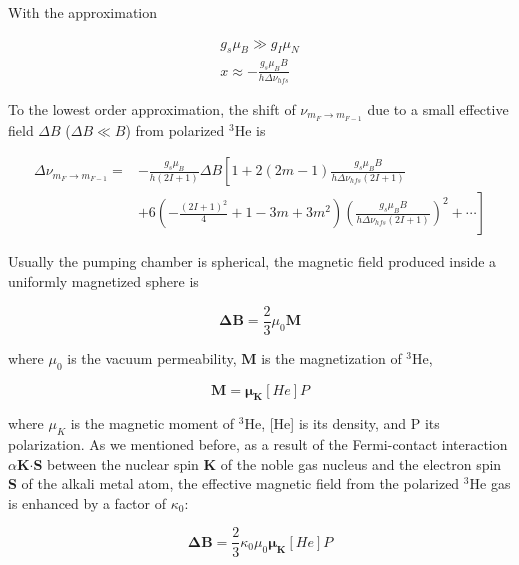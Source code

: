 With the approximation

\begin{subequations}
	\begin{gather}
	g_{s}\mu_{B} \gg g_{I}\mu_{N}\\
	x \approx -\frac{g_{s}\mu_{B}B}{h\Delta \nu_{hfs}}
	\end{gather}
\end{subequations}

To the lowest order approximation, the shift of $\nu_{m_{F}\rightarrow m_{F-1}}$ due to a small effective field $\Delta B$ ($\Delta B \ll B$) from polarized $^{3}$He is

\begin{equation}
\begin{split}
\Delta \nu_{m_{F}\rightarrow m_{F-1}} = &-\frac{g_{s}\mu_{B}}{h(2I+1)} \Delta B \left[1+ 2(2m-1)\frac{g_{s}\mu_{B}B}{h \Delta\nu_{hfs}(2I+1)}\right.\\ 
&\left.+6\left(-\frac{(2I+1)^{2}}{4}+1-3m+3m^{2}\right)\left(\frac{g_{s}\mu_{B}B}{h \Delta\nu_{hfs}(2I+1)}\right)^{2}+\cdots\right]
\end{split}
\end{equation}

Usually the pumping chamber is spherical, the magnetic field produced inside a uniformly magnetized sphere is

\begin{equation}
\boldsymbol{\Delta B}=\frac{2}{3}\mu_{0}\boldsymbol{M}
\end{equation}

where $\mu_{0}$ is the vacuum permeability, $\boldsymbol{M}$ is the magnetization of $^{3}$He, 

\begin{equation}
\boldsymbol{M}=\boldsymbol{\mu_{K}}[He]P
\end{equation}

where $\mu_{K}$ is the magnetic moment of $^{3}$He, [He] is its density, and P its polarization. As we mentioned before, as a result of the Fermi-contact interaction $\alpha${\bf K$\cdot$S} between the nuclear spin {\bf K} of the noble gas nucleus and the electron spin {\bf S} of the alkali metal atom, the effective magnetic field from the polarized $^{3}$He gas is enhanced by a factor of $\kappa_{0}$:

\begin{equation}
\boldsymbol{\Delta B}=\frac{2}{3} \kappa_{0}\mu_{0}\boldsymbol{\mu_{K}}[He]P
\end{equation}

